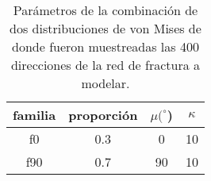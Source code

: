 \begin{table}[H]
	\centering
	\begin{tabular}{ |c|c|c|c|}
		\hline
		familia & proporci\'on & $\mu (^{\circ}$) & $\kappa$ \\ \hline
		f0     &    0.3     &   0   & 10       \\ \hline
		f90    &    0.7     &  90   & 10       \\ \hline
	\end{tabular}
	\caption{Par\'ametros de la combinaci\'on de dos distribuciones de von Mises de donde fueron muestreadas las 400 direcciones de la red de fractura a modelar.}
	\label{t:movMpar} %
\end{table}
